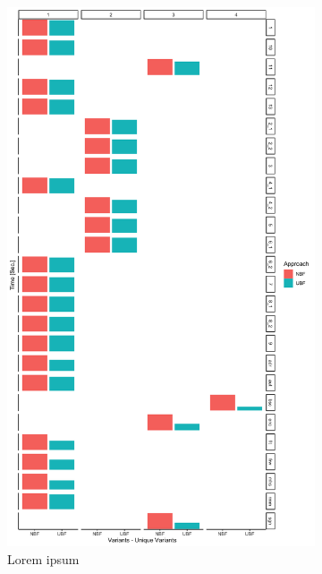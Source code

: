 \begin{figure}[t!]
    \centering
    \begin{subfigure}[t]{0.5\textwidth}
        \centering
        \includegraphics[scale=0.09]{figs/plots/enron-nbf-ubf.png}
        \caption{Lorem ipsum}
    \end{subfigure}%
    ~ 
    \begin{subfigure}[t]{0.5\textwidth}
        \centering

\end{subfigure}
\end{figure}
